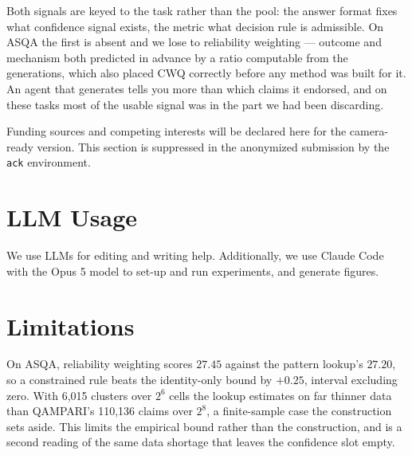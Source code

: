 \documentclass{article}
\begin{document}
Both signals are keyed to the task rather than the pool: the answer format fixes what confidence signal exists, the metric what decision rule is admissible. On ASQA the first is absent and we lose to reliability weighting --- outcome and mechanism both predicted in advance by a ratio computable from the generations, which also placed CWQ correctly before any method was built for it. An agent that generates tells you more than which claims it endorsed, and on these tasks most of the usable signal was in the part we had been discarding.

\begin{ack}
Funding sources and competing interests will be declared here for the camera-ready
version. This section is suppressed in the anonymized submission by the
\texttt{ack} environment.
\end{ack}

%
%


{\small}

\newpage
\appendix

\section{LLM Usage}

We use LLMs for editing and writing help. Additionally, we use Claude Code with the Opus 5 model to set-up and run experiments, and generate figures.

\section{Limitations}
\label{sec:limitations}

On ASQA, reliability weighting scores $27.45$ against the pattern lookup's $27.20$, so a constrained rule beats the identity-only bound by $+0.25$, interval excluding zero. With 6,015 clusters over $2^6$ cells the lookup estimates on far thinner data than QAMPARI's 110,136 claims over $2^8$, a finite-sample case the construction sets aside. This limits the empirical bound rather than the construction, and is a second reading of the same data shortage that leaves the confidence slot empty. %
\end{document}
